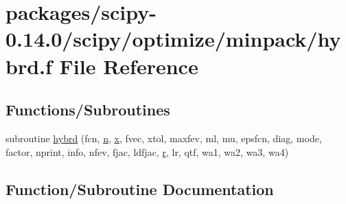 \hypertarget{hybrd_8f}{}\section{packages/scipy-\/0.14.0/scipy/optimize/minpack/hybrd.f File Reference}
\label{hybrd_8f}
\subsection*{Functions/\+Subroutines}
\begin{DoxyCompactItemize}
\item 
subroutine \hyperlink{hybrd_8f_a56c9888116ef44b6d73ffbf0c7ff18c2}{hybrd} (fcn, \hyperlink{indexexpr_8h_ab427e2e2b4d6cec55fa088ea2a692ace}{n}, \hyperlink{vecnorm1_8cc_ac73eed9e41ec09d58f112f06c2d6cb63}{x}, fvec, xtol, maxfev, ml, mu, epsfcn, diag, mode, factor, nprint, info, nfev, fjac, ldfjac, \hyperlink{indexexpr_8h_ac434fd11cc2493608d8d91424d60c17e}{r}, lr, qtf, wa1, wa2, wa3, wa4)
\end{DoxyCompactItemize}


\subsection{Function/\+Subroutine Documentation}
\hypertarget{hybrd_8f_a56c9888116ef44b6d73ffbf0c7ff18c2}{}
